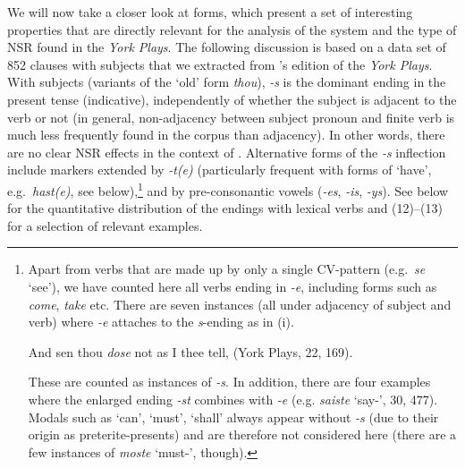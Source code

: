 \documentclass[output=paper]{langsci/langscibook}
\begin{document}
We will now take a closer look at \Ssg{} forms, which present a set of interesting properties that are directly relevant for the analysis of the  system and the type of \gls{NSR} found in the \emph{York Plays}. The following discussion is based on a data set of 852 clauses with \Ssg{} subjects that we extracted from \cite{Davidson:2011}'s edition of the \emph{York Plays}.
With \Ssg{} subjects (variants of the ‘old' form \emph{thou}), \emph{-s} is the
dominant ending in the present tense (indicative), independently of whether the
subject is adjacent to the verb or not (in general, non-adjacency between
subject pronoun and finite verb is much less frequently found in the corpus
than adjacency). In other words, there are no clear \gls{NSR} effects in the context of \Ssg{}. Alternative forms of the
    \emph{-s} inflection include markers extended by \emph{-t(e)} (particularly
    frequent with forms of ‘have’, e.g.\ \emph{hast(e)}, see
     below),\footnote{Apart from verbs that
        are made up by only a single CV-pattern (e.g.\ \emph{se} `see'), we
        have counted here all verbs ending in \emph{-e}, including forms such
        as \emph{come}, \emph{take} etc. There are seven instances (all under
        adjacency of subject and verb) where \emph{-e} attaches to the
        \emph{s}-ending as in (i).

    \begin{exe}
         And sen thou \textit{dose} not as I thee tell,
        \glt (York Plays, 22, 169).
    \end{exe}
    These are counted as instances of \emph{-s}. In addition, there are four
    examples where the enlarged ending \emph{-st} combines with \emph{-e} (e.g.
    \emph{saiste} `say-\Ssg{}', 30, 477). Modals such as `can', `must', `shall'
    always appear without \emph{-s} (due to their origin as preterite-presents) and are
    therefore not considered here (there are a few instances of \emph{moste}
‘must-\Ssg{}', though).} and by pre-consonantic vowels (\emph{-es},
\emph{-is}, \emph{-ys}). See  below for the quantitative
distribution of the \Ssg{} endings with lexical verbs and (12)--(13) for a
selection of relevant examples.
\end{document}
